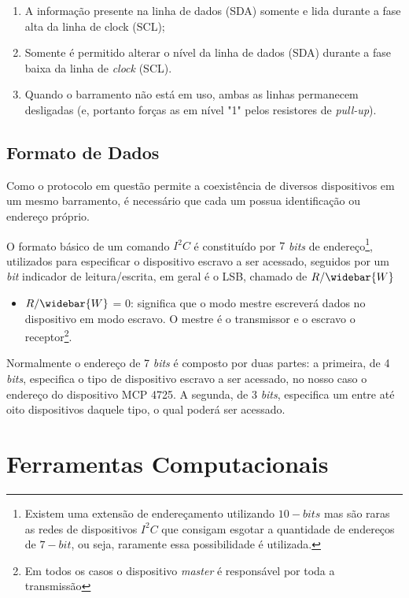 	\begin{enumerate}
		\item A informação presente na linha de dados (SDA) somente 
		e lida durante a fase alta da linha de clock (SCL);
		\item Somente é permitido alterar o nível da linha de dados (SDA) durante a fase baixa da linha de \textit{clock} (SCL).
		\item Quando o barramento não está em uso, ambas as linhas permanecem desligadas (e, portanto forças as em nível "1" pelos resistores de \textit{pull-up}).
	\end{enumerate}

	\subsection{Formato de Dados}
	
		Como o protocolo em questão permite a coexistência de diversos dispositivos em um mesmo barramento, é necessário que cada um possua identificação ou endereço próprio.
		
		O formato básico de um comando $I^2C$ é constituído por $ 7 $ \textit{bits} de endereço\footnote{Existem uma extensão de endereçamento utilizando $10-bits$ mas são raras as redes de dispositivos $ I^2C $ que consigam esgotar a quantidade de endereços de $ 7-bit $, ou seja, raramente essa possibilidade é utilizada.}, utilizados para especificar o dispositivo escravo a ser acessado, seguidos por um \textit{bit} indicador de leitura/escrita, em geral é o LSB, chamado de $R/\widebar{W}$
		
		\begin{itemize}
			\item $ R/\widebar{W} $ = 0: significa que o modo mestre escreverá dados no dispositivo em modo escravo. O mestre é o transmissor e o escravo o receptor\footnote{Em todos os casos o dispositivo \textit{master} é responsável por toda a transmissão}. 
		\end{itemize}
		
		Normalmente o endereço de 7 \textit{bits} é composto por duas partes: a primeira, de 4 \textit{bits}, especifica o tipo de dispositivo escravo a ser acessado, no nosso caso o endereço do dispositivo MCP 4725. A segunda, de 3 \textit{bits}, especifica um entre até oito dispositivos daquele tipo, o qual poderá ser acessado.
		
		
\section{Ferramentas Computacionais}

